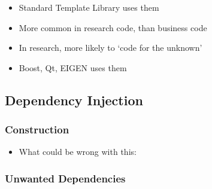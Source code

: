 \begin{itemize}
\tightlist
\item
  Standard Template Library uses them
\item
  More common in research code, than business code
\item
  In research, more likely to `code for the unknown'
\item
  Boost, Qt, EIGEN uses them
\end{itemize}

\hypertarget{dependency-injection}{%
\subsection{Dependency Injection}\label{dependency-injection}}

\hypertarget{construction}{%
\subsubsection{Construction}\label{construction}}

\begin{itemize}
\tightlist
\item
  What could be wrong with this:
\end{itemize}

\begin{Shaded}
\begin{Highlighting}[]

\NormalTok{\};}

\NormalTok{:}
\NormalTok{  \{}
    \NormalTok{ = }
\NormalTok{  \}}

\NormalTok{:}
\NormalTok{;}
\NormalTok{\};}

\NormalTok{\{}
\NormalTok{\}}

\end{Highlighting}
\end{Shaded}

\hypertarget{unwanted-dependencies}{%
\subsubsection{Unwanted Dependencies}\label{unwanted-dependencies}}

